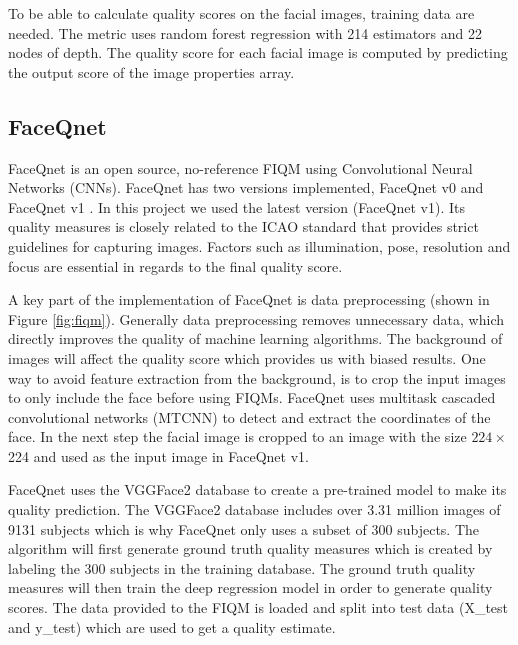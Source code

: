 To be able to calculate quality scores on the facial images, training data are needed. The metric uses random forest regression \cite{RandomForestRegressor} with 214 estimators and 22 nodes of depth. The quality score for each facial image is computed by predicting the output score of the image properties array.  

\subsection{FaceQnet}
FaceQnet \cite{FaceQnet} is an open source, no-reference FIQM using Convolutional Neural Networks (CNNs). FaceQnet has two versions implemented, FaceQnet v0 \cite{hernandezortega2019faceqnet} and FaceQnet v1 \cite{hernandezortega2021biometric}. In this project we used the latest version (FaceQnet v1). Its quality measures is closely related to the ICAO standard \cite{ICAO2} that provides strict guidelines for capturing images. Factors such as illumination, pose, resolution and focus are essential in regards to the final quality score.

A key part of the implementation of FaceQnet is data preprocessing (shown in Figure \ref{fig:fiqm}). Generally data preprocessing removes unnecessary data, which directly improves the quality of machine learning algorithms. The background of images will affect the quality score which provides us with biased results. One way to avoid feature extraction from the background, is to crop the input images to only include the face before using FIQMs. FaceQnet uses multitask cascaded convolutional networks (MTCNN) to detect and extract the coordinates of the face. In the next step the facial image is cropped to an image with the size $224 \times $224 and used as the input image in FaceQnet v1. 

FaceQnet uses the VGGFace2 \cite{VGGFace2} database to create a pre-trained model to make its quality prediction. The VGGFace2 database includes over 3.31 million images of 9131 subjects which is why FaceQnet only uses a subset of 300 subjects. The algorithm will first generate ground truth quality measures which is created by labeling the 300 subjects in the training database. The ground truth quality measures will then train the deep regression model in order to generate quality scores. The data provided to the FIQM is loaded and split into test data (X\_test and y\_test) which are used to get a quality estimate. 

